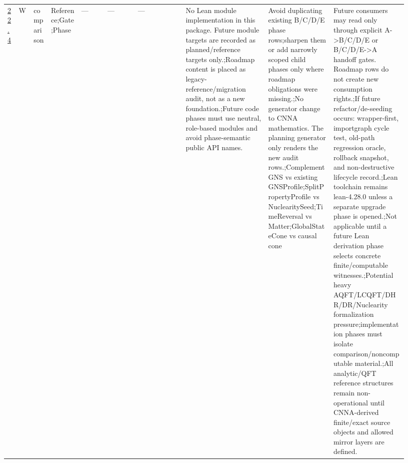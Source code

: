 \begin{longtable}{L{0.026\linewidth} L{0.024\linewidth} L{0.045\linewidth} L{0.07\linewidth} L{0.065\linewidth} L{0.075\linewidth} L{0.11\linewidth} L{0.19\linewidth} L{0.155\linewidth} L{0.17\linewidth}}
\hline
\addlinespace[0.24em]
\hyperlink{phase-row-22-4}{22.4} & W & comparison & Reference;\newline Gate;\newline Phase & --- & --- & --- & No Lean module implementation in this package. Future module targets are recorded as planned/\allowbreak{}reference targets only.;\newline Roadmap content is placed as legacy-reference/\allowbreak{}migration audit, not as a new foundation.;\newline Future code phases must use neutral, role-based modules and avoid phase-semantic public API names. & Avoid duplicating existing B/\allowbreak{}C/\allowbreak{}D/\allowbreak{}E phase rows;\newline sharpen them or add narrowly scoped child phases only where roadmap obligations were missing.;\newline No generator change to CNNA mathematics. The planning generator only renders the new audit rows.;\newline ComplementGNS vs existing GNSProfile;\newline SplitPropertyProfile vs NuclearitySeed;\newline TimeReversal vs Matter;\newline GlobalStateCone vs causal cone & Future consumers may read only through explicit A->B/\allowbreak{}C/\allowbreak{}D/\allowbreak{}E or B/\allowbreak{}C/\allowbreak{}D/\allowbreak{}E->A handoff gates. Roadmap rows do not create new consumption rights.;\newline If future refactor/\allowbreak{}de-seeding occurs: wrapper-first, importgraph cycle test, old-path regression oracle, rollback snapshot, and non-destructive lifecycle record.;\newline Lean toolchain remains lean-4.28.0 unless a separate upgrade phase is opened.;\newline Not applicable until a future Lean derivation phase selects concrete finite/\allowbreak{}computable witnesses.;\newline Potential heavy AQFT/\allowbreak{}LCQFT/\allowbreak{}DHR/\allowbreak{}DR/\allowbreak{}Nuclearity formalization pressure;\newline implementation phases must isolate comparison/\allowbreak{}noncomputable material.;\newline All analytic/\allowbreak{}QFT reference structures remain non-operational until CNNA-derived finite/\allowbreak{}exact source objects and allowed mirror layers are defined.\\

\end{longtable}
